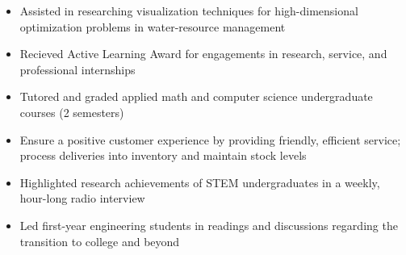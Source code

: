 \documentclass[10pt,a4paper,ragged2e,withhyper]{altacv}
\begin{document}
\begin{paracol}{2}
  \begin{itemize}
    \item Assisted in researching visualization techniques for high-dimensional optimization problems in water-resource management
    \item Recieved Active Learning Award for engagements in research, service, and professional internships
    \item Tutored and graded applied math and computer science undergraduate courses (2 semesters)
  \end{itemize}

  \bigskip


  \begin{itemize}
    \item Ensure a positive customer experience by providing friendly, efficient service; process deliveries into inventory and maintain stock levels
  \end{itemize}

  \vspace{-0.5em}
  \divider

  \begin{itemize}
    \item Highlighted research achievements of STEM undergraduates in a weekly, hour-long radio interview
  \end{itemize}

  \vspace{-0.5em}
  \divider

  \begin{itemize}
    \item Led first-year engineering students in readings and discussions regarding the transition to college and beyond
  \end{itemize}

  \switchcolumn



\end{paracol}
\end{document}
